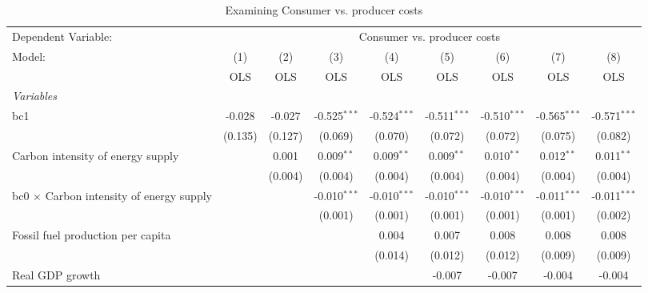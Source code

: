 
\begin{table}[htbp]
   \caption{Examining Consumer vs. producer costs}
   \centering
   \begin{tabular}{lcccccccc}
      \toprule
      Dependent Variable: & \multicolumn{8}{c}{Consumer vs. producer costs}\\
      Model:                                          & (1)     & (2)     & (3)            & (4)            & (5)            & (6)            & (7)            & (8)\\  
                                                      &  OLS    & OLS     & OLS            & OLS            & OLS            & OLS            & OLS            & OLS\\  
      \midrule
      \emph{Variables}\\
      bc1                                             & -0.028  & -0.027  & -0.525$^{***}$ & -0.524$^{***}$ & -0.511$^{***}$ & -0.510$^{***}$ & -0.565$^{***}$ & -0.571$^{***}$\\   
                                                      & (0.135) & (0.127) & (0.069)        & (0.070)        & (0.072)        & (0.072)        & (0.075)        & (0.082)\\   
      Carbon intensity of energy supply               &         & 0.001   & 0.009$^{**}$   & 0.009$^{**}$   & 0.009$^{**}$   & 0.010$^{**}$   & 0.012$^{**}$   & 0.011$^{**}$\\   
                                                      &         & (0.004) & (0.004)        & (0.004)        & (0.004)        & (0.004)        & (0.004)        & (0.004)\\   
      bc0 $\times$ Carbon intensity of energy supply  &         &         & -0.010$^{***}$ & -0.010$^{***}$ & -0.010$^{***}$ & -0.010$^{***}$ & -0.011$^{***}$ & -0.011$^{***}$\\   
                                                      &         &         & (0.001)        & (0.001)        & (0.001)        & (0.001)        & (0.001)        & (0.002)\\   
      Fossil fuel production per capita               &         &         &                & 0.004          & 0.007          & 0.008          & 0.008          & 0.008\\   
                                                      &         &         &                & (0.014)        & (0.012)        & (0.012)        & (0.009)        & (0.009)\\   
      Real GDP growth                                 &         &         &                &                & -0.007         & -0.007         & -0.004         & -0.004\\   

\end{tabular}
\end{table}

